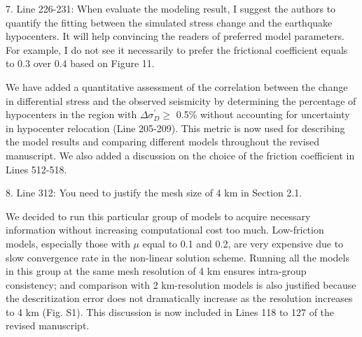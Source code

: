 \documentclass[12pt]{article}
\begin{document}
\begin{response}{7. Line 226-231: When evaluate the modeling result, I suggest the authors to quantify the fitting between the simulated stress change and the earthquake hypocenters. It will help convincing the readers of preferred model parameters. For example, I do not see it necessarily to prefer the frictional coefficient equals to 0.3 over 0.4 based on Figure 11.}

   We have added a quantitative assessment of the correlation between the change in differential stress and the observed seismicity by determining the percentage of hypocenters in the region with $\Delta\sigma_{D}^\prime \ge$ 0.5\% without accounting for uncertainty in hypocenter relocation (Line 205-209). This metric is now used for describing the model results and comparing different models throughout the revised manuscript. We also added a discussion on the choice of the friction coefficient in Lines 512-518.
\end{response}

\begin{response}{8. Line 312: You need to justify the mesh size of 4 km in Section 2.1.}

We decided to run this particular group of models to acquire necessary information without increasing computational cost too much. Low-friction models, especially those with $\mu$ equal to 0.1 and 0.2, are very expensive 
due to slow convergence rate in the non-linear solution scheme. Running all the models in this group at the same mesh resolution of 4 km ensures intra-group consistency; and comparison with 2 km-resolution models is also justified because the descritization error does not dramatically increase as the resolution increases to 4 km (Fig. S1). This discussion is now included in Lines 118 to 127 of the revised manuscript. %
\end{response}
\end{document}
